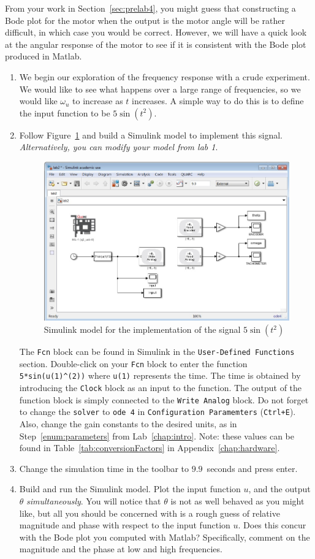 From your work in Section~\ref{sec:prelab4}, you might guess that
constructing a Bode plot for the motor when the output is the motor angle
will be rather difficult, in which case you would be correct.  However, we
will have a quick look at the angular response of the motor to see if it is
consistent with the Bode plot produced in \textsf{Matlab}.

\begin{enumerate}
\item We begin our exploration of the frequency response with a crude
experiment.  We would like to see what happens over a large range of
frequencies, so we would like $\omega_u$ to increase as $t$ increases.  A
simple way to do this is to define the input function to be $5\sin(t^{2})$\@.
\item Follow Figure~\ref{fig:model4} and build a \textsf{Simulink} model to
implement this signal. \emph{Alternatively, you can modify your model from lab 1}.
\begin{figure}[htbp]
\centering
\includegraphics[width=0.6\hsize]{pix/lab2.jpg}
\caption{\textsf{Simulink} model for the implementation of the signal $5\sin(t^{2})$}\label{fig:model4}
\end{figure}%
The \verb|Fcn| block can be found in \textsf{Simulink} in the
\verb|User-Defined Functions| section.  Double-click on your \verb|Fcn| block
to enter the function \verb|5*sin(u(1)^(2))| where \verb|u(1)| represents the
time.  The time is obtained by introducing the \verb|Clock| block as an input
to the function.  The output of the function block is simply connected to the
\verb|Write Analog| block.  Do not forget to change the \verb|solver| to
\verb|ode 4| in \verb|Configuration Paramemters| (\verb|Ctrl+E|). Also,
change the gain constants to the desired units, as in
Step~\ref{enum:parameters} from Lab~\ref{chap:intro}\@. Note: these values can be found in 
Table~\ref{tab:conversionFactors} in Appendix~\ref{chap:hardware}.
\item Change the simulation time in the toolbar to $9.9$~seconds and press enter.
\item \label{enum:simulatet2} Build and run the \textsf{Simulink} model.
Plot the input function $u$, and the output $\theta$ \emph{simultaneously}.
You will notice that $\theta$ is not as well behaved as you might like, but
all you should be concerned with is a rough guess of relative magnitude and
phase with respect to the input function $u$\@.  Does this concur with the
Bode plot you computed with \textsf{Matlab}?  Specifically, comment on the
magnitude and the phase at low and high frequencies.


\end{enumerate}
